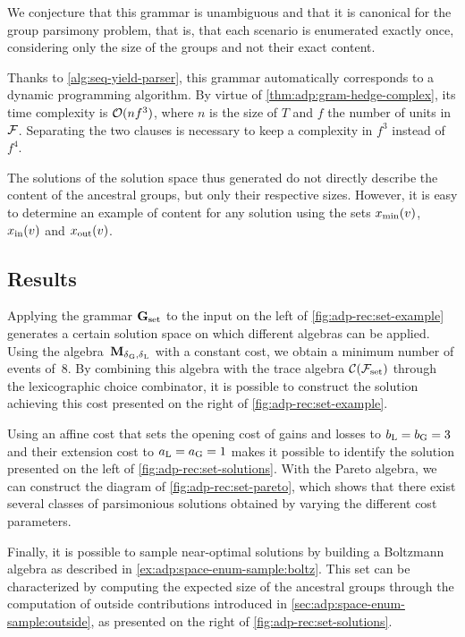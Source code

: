 We conjecture that this grammar is unambiguous and that it is canonical for the group parsimony problem, that is, that each scenario is enumerated exactly once, considering only the size of the groups and not their exact content.

Thanks to \cref{alg:seq-yield-parser}, this grammar automatically corresponds to a dynamic programming algorithm.
By virtue of \cref{thm:adp:gram-hedge-complex}, its time complexity is \(\operatorname{\mathcal{O}}(nf^3)\), where \(n\) is the size of \(T\) and \(f\) the number of units in \(\mathcal{F}\).
Separating the two clauses  is necessary to keep a complexity in \(f^3\) instead of \(f^4\).

The solutions of the solution space thus generated do not directly describe the content of the ancestral groups, but only their respective sizes.
However, it is easy to determine an example of content for any solution using the sets \(x_{\mathrm{min}}(v)\), \(x_{\mathrm{in}}(v)\) and \(x_{\mathrm{out}}(v)\).

\subsection{Results}

Applying the grammar \(\mathbf{G}_{\mathrm{set}}\) to the input on the left of \cref{fig:adp-rec:set-example} generates a certain solution space on which different algebras can be applied.
Using the algebra~\(\mathbf{M}_{\delta\kern.1pt_{\mathrm{G}},\delta\kern.1pt_{\mathrm{L}}}\) with a constant cost, we obtain a minimum number of events of~8.
By combining this algebra with the trace algebra \(\mathcal{C}(\mathcal{F}_{\mathrm{set}})\) through the lexicographic choice combinator, it is possible to construct the solution achieving this cost presented on the right of \cref{fig:adp-rec:set-example}.

Using an affine cost that sets the opening cost of gains and losses to \(b_{\mathrm{L}} = b_{\mathrm{G}} = 3\) and their extension cost to \(a_{\mathrm{L}} = a_{\mathrm{G}} = 1\) makes it possible to identify the solution presented on the left of \cref{fig:adp-rec:set-solutions}.
With the Pareto algebra, we can construct the diagram of \cref{fig:adp-rec:set-pareto}, which shows that there exist several classes of parsimonious solutions obtained by varying the different cost parameters.

Finally, it is possible to sample near-optimal solutions by building a Boltzmann algebra as described in \cref{ex:adp:space-enum-sample:boltz}.
This set can be characterized by computing the expected size of the ancestral groups through the computation of outside contributions introduced in \cref{sec:adp:space-enum-sample:outside}, as presented on the right of \cref{fig:adp-rec:set-solutions}.

